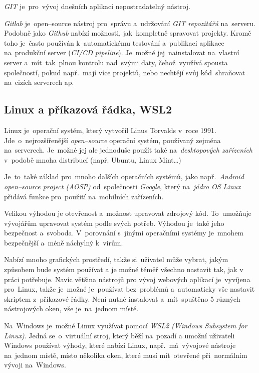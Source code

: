 \documentclass[10pt,a4paper]{article}
\begin{document}
            \emph{GIT} je~pro~vývoj dnešních aplikací nepostradatelný nástroj. \cite{gitscmBook}
            
            \emph{Gitlab} je~open--source nástroj pro~správu a~udržování \emph{GIT repozitářů} na~serveru. Podobně jako \emph{Github} nabízí možnosti, jak~kompletně spravovat projekty. Kromě toho je~často používán k~automatickému testování a~publikaci aplikace na~produkční server (\emph{CI/CD pipeline}). Je~možné jej~nainstalovat na~vlastní server a~mít~tak~plnou kontrolu nad~svými daty, čehož~využívá spousta společností, pokud např.~mají více projektů, nebo nechtějí svůj kód~shraňovat na~cizích serverech ap. \cite{gitlab:CICD}

        \subsection{Linux a příkazová řádka, WSL2}
            Linux je~operační systém, který vytvořil Linus Torvalds v~roce 1991. Jde~o~nejrozšířenější \emph{open--source} operační systém, používaný zejména na~serverech. Je~možné jej ale jednoduše použít také na~\emph{desktopových zařízeních} v~podobě mnoha distribucí (např. Ubuntu, Linux Mint\dots)
            
            Je~to~také základ pro~mnoho dalších operačních systémů, jako např.~\emph{Android \emph{open--source} project (\emph{AOSP})} od~společnosti \emph{Google}, který na~\emph{jádro OS Linux} přidává funkce pro~použití na~mobilních zařízeních. \cite{AOSP:linux}
            
            Velikou výhodou je otevřenost a~možnost upravovat zdrojový kód. To~umožňuje vývojářům upravovat systém podle svých potřeb. Výhodou je~také jeho bezpečnost a~svoboda. V~porovnání s~jinými operačními systémy je~mnohem bezpečnější a~méně náchylný k~virům. \cite{medium:LinuxSecure}

            Nabízí mnoho grafických prostředí, takže si~uživatel může vybrat, jakým způsobem bude systém používat a je možné téměř
            všechno nastavit tak, jak v práci potřebuje. Navíc většina nástrojů pro vývoj webových aplikací je~vyvíjena pro~Linux, takže je~možné je~používat bez~problémů a~automaticky vše nastavit skriptem z~příkazové řádky. Není nutné instalovat a~mít~spuštěno 5 různých nástrojových oken, vše je~na~jednom místě.

            Na~Windows je~možné Linux využívat pomocí \emph{WSL2 (Windows Subsystem for Linux)}. Jedná se~o~virtuální stroj, který běží na~pozadí a umožní uživateli Windows používat výhody, které nabízí Linux, např.~má~vývojové nástroje na~jednom místě, místo několika oken, které musí mít~otevřené při~normálním vývoji na~Windows.
\end{document}
